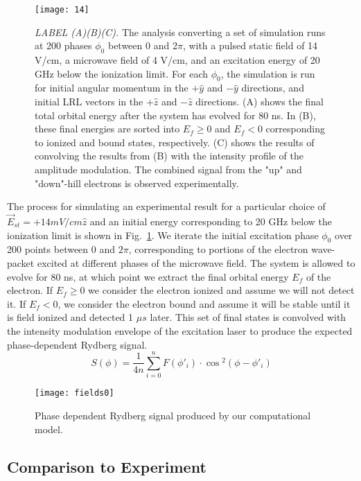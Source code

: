 \documentclass[aps,pra,preprint,groupedaddress]{revtex4-1}
\begin{document}
\begin{figure}
	\texttt{[image: 14]}
	\caption{\emph{LABEL (A)(B)(C).} The analysis converting a set of simulation runs at 200 phases $\phi_0$ between 0 and 2$\pi$, with a pulsed static field of 14 V/cm, a microwave field of 4 V/cm, and an excitation energy of 20 GHz below the ionization limit. For each $\phi_0$, the simulation is run for initial angular momentum in the $+\hat{y}$ and $-\hat{y}$ directions, and initial LRL vectors in the $+\hat{z}$ and $-\hat{z}$ directions. (A) shows the final total orbital energy after the system has evolved for 80 ns. In (B), these final energies are sorted into $E_f\geq 0$ and $E_f<0$ corresponding to ionized and bound states, respectively. (C) shows the results of convolving the results from (B) with the intensity profile of the amplitude modulation. The combined signal from the "up" and "down"-hill electrons is observed experimentally.}
	\label{fig:ModEval}
\end{figure}

The process for simulating an experimental result for a particular choice of $\vec{E}_{st} = + 14 mV/cm \hat{z}$ and an initial energy corresponding to 20 GHz below the ionization limit is shown in Fig.~\ref{fig:ModEval}. We iterate the initial excitation phase $\phi_0$ over 200 points between 0 and $2\pi$, corresponding to portions of the electron wave-packet excited at different phases of the microwave field. The system is allowed to evolve for 80 ns, at which point we extract the final orbital energy $E_f$ of the electron. If $E_f \geq 0$ we consider the electron ionized and assume we will not detect it. If $E_f < 0$, we consider the electron bound and assume it will be stable until it is field ionized and detected 1 $\mu s$ later. This set of final states is convolved with the intensity modulation envelope of the excitation laser to produce the expected phase-dependent Rydberg signal.
\begin{equation}
S(\phi) = \frac{1}{4n} \sum_{i=0}^{n} F(\phi\prime_i) \cdot \cos{^2(\phi - \phi\prime_i)}
\end{equation}

\begin{figure}
\texttt{[image: fields0]}
\caption{Phase dependent Rydberg signal produced by our computational model.}
\label{fig:SimMod}
\end{figure}

\subsection{Comparison to Experiment}
\label{sec:ComptoExp}
\end{document}
